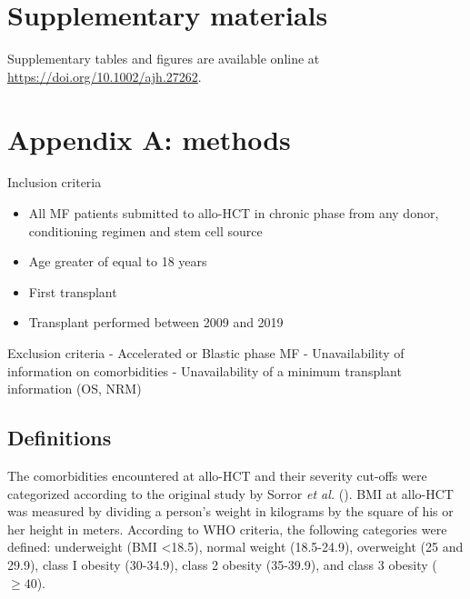 \documentclass[
  letterpaper,
  paper=240mm:170mm,
  twoside=true,
  open=right,
  fontsize=10pt,
  pagesize=false,
  BCOR=15mm,
  DIV=14,
  headinclude=true,
  footinclude=false,
  headsepline=on]{scrbook}
\providecommand{\tightlist}{%
  \setlength{\itemsep}{0pt}\setlength{\parskip}{0pt}}\usepackage{longtable,booktabs,array}
\begin{document}
\section*{Supplementary materials}\label{supplementary-materials-2}


Supplementary tables and figures are available online at
\url{https://doi.org/10.1002/ajh.27262}.

\section*{Appendix A: methods}\label{appendix-a-methods}


Inclusion criteria

\begin{itemize}
\tightlist
\item
  All MF patients submitted to allo-HCT in chronic phase from any donor,
  conditioning regimen and stem cell source
\item
  Age greater of equal to 18 years
\item
  First transplant
\item
  Transplant performed between 2009 and 2019
\end{itemize}

Exclusion criteria - Accelerated or Blastic phase MF - Unavailability of
information on comorbidities - Unavailability of a minimum transplant
information (OS, NRM)

\subsection*{Definitions}\label{definitions}

The comorbidities encountered at allo-HCT and their severity cut-offs
were categorized according to the original study by Sorror \emph{et al.}
(). BMI
at allo-HCT was measured by dividing a person's weight in kilograms by
the square of his or her height in meters. According to WHO criteria,
the following categories were defined: underweight (BMI \textless18.5),
normal weight (18.5-24.9), overweight (25 and 29.9), class I obesity
(30-34.9), class 2 obesity (35-39.9), and class 3 obesity (\(\geq 40\)).
\end{document}
